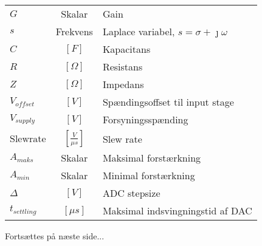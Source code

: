 \begin{table}[ht!]
\begin{threeparttable}
\begin{tabular}{l c p{}}
			$G$ & Skalar & Gain \\
			$s$ & Frekvens & Laplace variabel, $s = \sigma + \jmath \omega$ \\
			$C$ & $\left[\si{F}\right]$ & Kapacitans\\
			$R$ & $\left[\si{\Omega}\right]$ & Resistans\\
			$Z$ & $\left[\si{\Omega}\right]$ & Impedans\\
			$V_{offset}$ & $\left[\si{V}\right]$ & Spændingsoffset til input stage \\
			$V_{supply}$ & $\left[\si{V}\right]$ & Forsyningsspænding \\
			$\mathrm{Slew rate}$ & $\left[\si{\frac{V}{\mu s}}\right]$ & Slew rate \\
			$A_{maks}$ & Skalar & Maksimal forstærkning \\
			$A_{min}$ & Skalar & Minimal forstærkning\\
			$\Delta$ & $\left[\si{V}\right]$ & ADC stepsize\\
			$t_{settling}$ & $\left[\si{\mu s}\right]$ & Maksimal indsvingningstid af DAC\\
			
		
		\end{tabular}
	\begin{tablenotes}
		\item[] Fortsættes på næste side...
	\end{tablenotes}
	\end{threeparttable}
\end{table}

